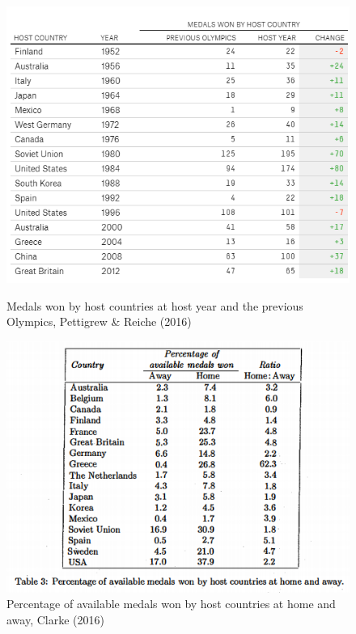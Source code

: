 \documentclass[12pt]{article}
\begin{document}
\begin{figure}[!b]
  \begin{minipage}[b]{0.45\textwidth}
  \centering
    \includegraphics[scale=0.3]{pics/2-1.png}
    \caption{\footnotesize Medals won by host countries at host year and the previous Olympics, Pettigrew \& Reiche (2016)}
    \label{fig:1}
  \end{minipage}
  \hfill
  \begin{minipage}[b]{0.45\textwidth}
  \centering
    \includegraphics[trim={0 0.9cm 0 0},clip, angle=0.2,origin=c,scale=0.4]{pics/2-3.png}
    \caption{\footnotesize Percentage of available medals won by host countries at home and away, Clarke (2016)}
    \label{fig:2}
  \end{minipage}
\end{figure}
\end{document}
